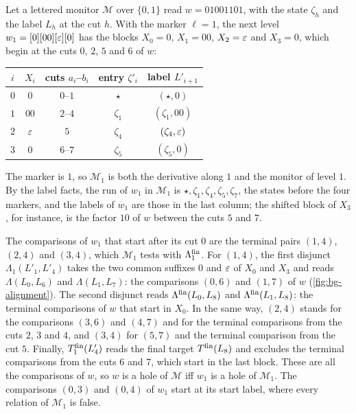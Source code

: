 \begin{example}[A derivative]
Let a lettered monitor $\mathcal M$ over $\{0,1\}$ read $w=01001101$, with the
state $\zeta_h$ and the label $L_h$ at the cut $h$. With the marker $\ell=1$,
the next level $w_1=[0][00][\varepsilon][0]$ has the blocks $X_0=0$, $X_1=00$,
$X_2=\varepsilon$ and $X_3=0$, which begin at the cuts $0$, $2$, $5$ and $6$ of $w$:
\begin{center}
\small
\begin{tabular}{@{}ccccc@{}}
\toprule
$i$ & $X_i$ & cuts $a_i$--$b_i$ & entry $\zeta'_i$ & label $L'_{i+1}$\\
\midrule
$0$ & $0$ & $0$--$1$ & $\star$ & $(\star,0)$\\
$1$ & $00$ & $2$--$4$ & $\zeta_1$ & $(\zeta_1,00)$\\
$2$ & $\varepsilon$ & $5$ & $\zeta_4$ & $(\zeta_4,\varepsilon)$\\
$3$ & $0$ & $6$--$7$ & $\zeta_5$ & $(\zeta_5,0)$\\
\bottomrule
\end{tabular}
\end{center}
The marker is $1$, so $\mathcal M_1$ is both the derivative along $1$ and the
monitor of level $1$. By the label facts, the run of $w_1$ in $\mathcal M_1$ is
$\star,\zeta_1,\zeta_4,\zeta_5,\zeta_7$, the states before the four markers,
and the labels of $w_1$ are those in the last column; the shifted block of
$X_3$, for instance, is the factor $10$ of $w$ between the cuts $5$ and $7$.

The comparisons of $w_1$ that start after its cut $0$ are the terminal pairs
$(1,4)$, $(2,4)$ and $(3,4)$, which $\mathcal M_1$ tests with $\Lambda^{\mathrm{fin}}_1$. For
$(1,4)$, the first disjunct $\Lambda_1(L'_1,L'_4)$ takes the two common
suffixes $0$ and $\varepsilon$ of $X_0$ and $X_3$ and reads $\Lambda(L_0,L_6)$ and
$\Lambda(L_1,L_7)$: the comparisons $(0,6)$ and $(1,7)$ of $w$
(\cref{fig:bg-alignment}). The second disjunct reads $\Lambda^{\mathrm{fin}}(L_0,L_8)$ and
$\Lambda^{\mathrm{fin}}(L_1,L_8)$: the terminal comparisons of $w$ that start in $X_0$. In the
same way, $(2,4)$ stands for the comparisons $(3,6)$ and $(4,7)$ and for the
terminal comparisons from the cuts $2$, $3$ and $4$, and $(3,4)$ for $(5,7)$
and the terminal comparison from the cut $5$. Finally, $T^{\mathrm{fin}}_1(L'_4)$ reads
the final target $T^{\mathrm{fin}}(L_8)$ and excludes the terminal comparisons from the
cuts $6$ and $7$, which start in the last block. These are all the comparisons
of $w$, so $w$ is a hole of $\mathcal M$ iff $w_1$ is a hole of $\mathcal M_1$.
The comparisons $(0,3)$ and $(0,4)$ of $w_1$ start at its start label, where
every relation of $\mathcal M_1$ is false.
\end{example}

